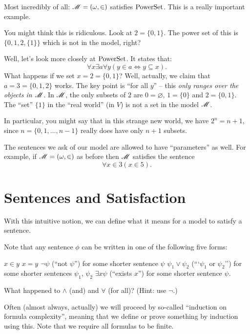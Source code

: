 \begin{example}
	Most incredibly of all: $\mathscr M = (\omega, \in)$ satisfies $\mathrm{PowerSet}$.
	This is a really important example.
	
	You might think this is ridiculous. Look at $2 = \{0,1\}$.
	The power set of this is $\{0, 1, 2, \{1\}\}$ which is not in the model, right?

	Well, let's look more closely at $\mathrm{PowerSet}$. It states that:
	\[ \forall x \exists a \forall y (y \in a \iff y \subseteq x). \]
	What happens if we set $x = 2 = \{0,1\}$?
	Well, actually, we claim that $a = 3 = \{0,1,2\}$ works.
	The key point is ``for all $y$'' -- this \emph{only ranges over the objects in $\mathscr M$}.
	In $\mathscr M$, the only subsets of $2$ are $0 = \varnothing$,
	$1 = \{0\}$ and $2 = \{0,1\}$.
	The ``set'' $\{1\}$ in the ``real world'' (in $V$) is not a set in the model $\mathscr M$.

	In particular, you might say that in this strange new world,
	we have $2^n = n+1$, since $n = \{0,1,\dots,n-1\}$ really does
	have only $n+1$ subsets.
\end{example}

\begin{example}
	The sentences we ask of our model are allowed to have ``parameters'' as well.
	For example, if $\mathscr M = (\omega, \in)$ as before then $\mathscr M$ satisfies the sentence
	\[ \forall x \in 3 (x \in 5). \]
\end{example}

\section{Sentences and Satisfaction}
With this intuitive notion, we can define what it means for a model to satisfy a sentence.
\begin{definition}
Note that any sentence $\phi$ can be written in one of the following five forms:
\begin{itemize}
	\ii $x \in y$
	\ii $x = y$
	\ii $\neg \psi$ (``not $\psi$'') for some shorter sentence $\psi$
	\ii $\psi_1 \lor \psi_2$ (```$\psi_1$ or $\psi_2$'')
	for some shorter sentences $\psi_1$, $\psi_2$
	\ii $\exists x \psi$ (``exists $x$'') for some shorter sentence $\psi$.
\end{itemize}
\end{definition}
\begin{ques}
	What happened to $\land$ (and) and $\forall$ (for all)?
	(Hint: use $\neg$.)
\end{ques}
Often (almost always, actually) we will proceed by so-called ``induction on formula complexity'',
meaning that we define or prove something by induction using this.
Note that we require all formulas to be finite.

